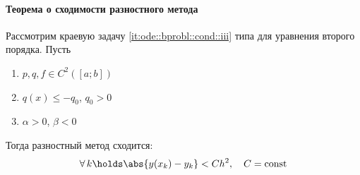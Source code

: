 \documentclass{trlnotes}
\begin{document}
\paragraph{Теорема о сходимости разностного метода}
\label{par:ode::finddivconv}


\begin{thrm}\label{thrm:ode::finddivconv::conv}
  Рассмотрим краевую задачу \ref{it:ode::bprobl::cond::iii} типа для уравнения второго порядка.
  Пусть 
  \begin{enumerate}
    \item $p, q, f \in C^2([a;b])$
    \item $q(x) \leqslant -q_0$, $q_0 > 0$
    \item $α > 0$, $β < 0$
  \end{enumerate}
  Тогда разностный метод сходится: 
  \[
    \forall \, k \holds \abs{y(x_k) - y_k} < Ch^2, \quad C=\mathrm{const}
  \]
\end{thrm}
\end{document}
